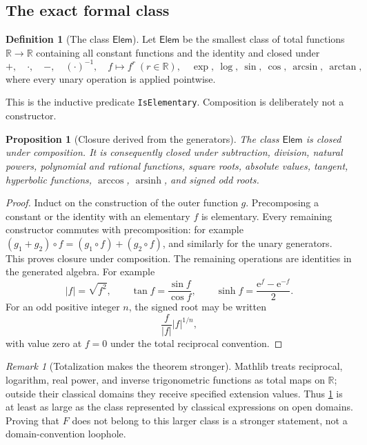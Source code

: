 \documentclass[11pt,oneside]{article}
\newtheorem{proposition}[theorem]{Proposition}
\theoremstyle{definition}
\newtheorem{definition}[theorem]{Definition}
\theoremstyle{remark}
\newtheorem{remark}[theorem]{Remark}
\newcommand{\R}{\mathbb R}
\newcommand{\e}{\mathrm e}
\newcommand{\lean}[1]{\texttt{#1}}
\begin{document}
\subsection{The exact formal class}

\begin{definition}[The class $\mathsf{Elem}$]
\label{def:elementary-class}
Let $\mathsf{Elem}$ be the smallest class of total functions $\R\to\R$ containing all
constant functions and the identity and closed under
\begin{equation}
 +,\quad\cdot,\quad-,\quad(\cdot)^{-1},\quad
 f\mapsto f^r\ (r\in\R),\quad
 \exp,\ \log,\ \sin,\ \cos,\ \arcsin,\ \arctan,
 \label{eq:elementary-generators}
\end{equation}
where every unary operation is applied pointwise.
\end{definition}

This is the inductive predicate \lean{IsElementary}.  Composition is deliberately not a
constructor.

\begin{proposition}[Closure derived from the generators]
\label{prop:elementary-derived}
The class $\mathsf{Elem}$ is closed under composition.  It is consequently closed under
subtraction, division, natural powers, polynomial and rational functions, square roots,
absolute values, tangent, hyperbolic functions, $\arccos$, $\operatorname{arsinh}$, and
signed odd roots.
\end{proposition}

\begin{proof}
Induct on the construction of the outer function $g$.  Precomposing a constant or the
identity with an elementary $f$ is elementary.  Every remaining constructor commutes with
precomposition: for example $(g_1+g_2)\circ f=(g_1\circ f)+(g_2\circ f)$, and similarly for
the unary generators.  This proves closure under composition.  The remaining operations
are identities in the generated algebra.  For example
\[
 |f|=\sqrt{f^2},
 \qquad
 \tan f=\frac{\sin f}{\cos f},
 \qquad
 \sinh f=\frac{\e^f-\e^{-f}}2.
\]
For an odd positive integer $n$, the signed root may be written
\[
 \frac{f}{|f|}|f|^{1/n},
\]
with value zero at $f=0$ under the total reciprocal convention.
\end{proof}

\begin{remark}[Totalization makes the theorem stronger]
\label{rem:elementary-totalization}
Mathlib treats reciprocal, logarithm, real power, and inverse trigonometric functions as
total maps on $\R$; outside their classical domains they receive specified extension values.
Thus \cref{def:elementary-class} is at least as large as the class represented by classical
expressions on open domains.  Proving that $F$ does not belong to this larger class is a
stronger statement, not a domain-convention loophole.
\end{remark}
\end{document}
